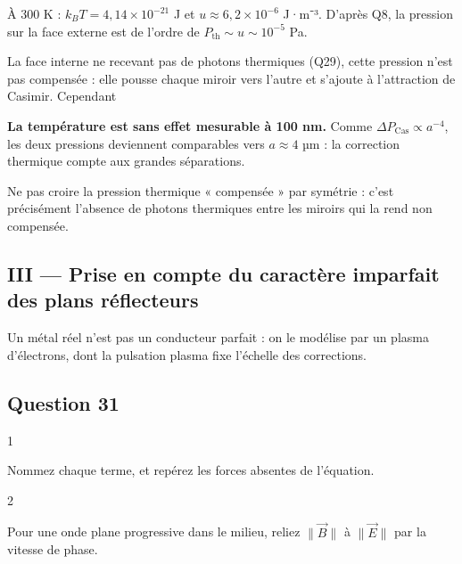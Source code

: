 \documentclass[11pt,a4paper]{article}
\newcommand{\equationajustee}[1]{%
  \sbox{\boiteequation}{$\displaystyle #1$}%
  \ifdim\wd\boiteequation>\linewidth
    \[\resizebox{\linewidth}{!}{\usebox{\boiteequation}}\]%
  \else
    \[#1\]%
  \fi}
\begin{document}
À 300 K : \(k_BT=4{,}14\times10^{-21}\) J et \(u\approx6{,}2\times10^{-6}\) J·m⁻³. D'après Q8, la pression sur la face externe est de l'ordre de \(P_{\mathrm{th}}\sim u\sim10^{-5}\) Pa.

La face interne ne recevant pas de photons thermiques (Q29), cette pression n'est pas compensée : elle pousse chaque miroir vers l'autre et s'ajoute à l'attraction de Casimir. Cependant

\equationajustee{\frac{P_{\mathrm{th}}}{\Delta P_{\mathrm{Cas}}(100\ \mathrm{nm})}\approx\frac{6\times10^{-6}}{13}\approx5\times10^{-7}}

\textbf{La température est sans effet mesurable à 100 nm.} Comme \(\Delta P_{\mathrm{Cas}}\propto a^{-4}\), les deux pressions deviennent comparables vers \(a\approx4\) µm : la correction thermique compte aux grandes séparations.

\begin{piege}

Ne pas croire la pression thermique « compensée » par symétrie : c'est précisément l'absence de photons thermiques entre les miroirs qui la rend non compensée.

\end{piege}

\hypertarget{iii-prise-en-compte-du-caractuxe8re-imparfait-des-plans-ruxe9flecteurs}{%
\subsection{III --- Prise en compte du caractère imparfait des plans réflecteurs}\label{iii-prise-en-compte-du-caractuxe8re-imparfait-des-plans-ruxe9flecteurs}}

Un métal réel n'est pas un conducteur parfait : on le modélise par un plasma d'électrons, dont la pulsation plasma fixe l'échelle des corrections.

\hypertarget{question-31}{%
\subsection{Question 31}\label{question-31}}

\begin{indication}{1}

Nommez chaque terme, et repérez les forces absentes de l'équation.

\end{indication}

\begin{indication}{2}

Pour une onde plane progressive dans le milieu, reliez \(\|\vec B\|\) à \(\|\vec E\|\) par la vitesse de phase.

\end{indication}
\end{document}
